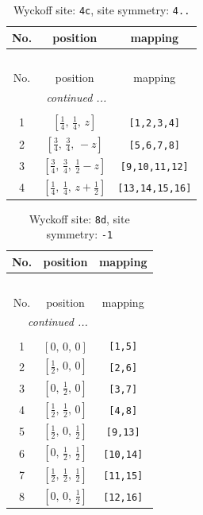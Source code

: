 \documentclass[fleqn,8pt]{jsarticle}
\begin{document}
\renewcommand{\arraystretch}{1.2}
\begin{longtable}{ccc}
\caption{Wyckoff site: {\tt 4c}, site symmetry: {\tt 4..}}
 \\
 \hline \hline
No. & position & mapping \\ \hline \endfirsthead

\multicolumn{2}{l}{\tablename\ \thetable{}} \\
 \hline \hline
No. & position & mapping \\ \hline \endhead

 \hline \hline
\multicolumn{2}{r}{\footnotesize\it continued ...} \\ \endfoot

 \hline \hline
\multicolumn{2}{r}{} \\ \endlastfoot

1 & $\left[ \frac{1}{4},\, \frac{1}{4},\, z \right]$ & {\tt [1,2,3,4]} \\ \hline
2 & $\left[ \frac{3}{4},\, \frac{3}{4},\, - z \right]$ & {\tt [5,6,7,8]} \\ \hline
3 & $\left[ \frac{3}{4},\, \frac{3}{4},\, \frac{1}{2} - z \right]$ & {\tt [9,10,11,12]} \\ \hline
4 & $\left[ \frac{1}{4},\, \frac{1}{4},\, z + \frac{1}{2} \right]$ & {\tt [13,14,15,16]} \\
\end{longtable}
\renewcommand{\arraystretch}{1.2}
\begin{longtable}{ccc}
\caption{Wyckoff site: {\tt 8d}, site symmetry: {\tt -1}}
 \\
 \hline \hline
No. & position & mapping \\ \hline \endfirsthead

\multicolumn{2}{l}{\tablename\ \thetable{}} \\
 \hline \hline
No. & position & mapping \\ \hline \endhead

 \hline \hline
\multicolumn{2}{r}{\footnotesize\it continued ...} \\ \endfoot

 \hline \hline
\multicolumn{2}{r}{} \\ \endlastfoot

1 & $\left[ 0,\, 0,\, 0 \right]$ & {\tt [1,5]} \\ \hline
2 & $\left[ \frac{1}{2},\, 0,\, 0 \right]$ & {\tt [2,6]} \\ \hline
3 & $\left[ 0,\, \frac{1}{2},\, 0 \right]$ & {\tt [3,7]} \\ \hline
4 & $\left[ \frac{1}{2},\, \frac{1}{2},\, 0 \right]$ & {\tt [4,8]} \\ \hline
5 & $\left[ \frac{1}{2},\, 0,\, \frac{1}{2} \right]$ & {\tt [9,13]} \\ \hline
6 & $\left[ 0,\, \frac{1}{2},\, \frac{1}{2} \right]$ & {\tt [10,14]} \\ \hline
7 & $\left[ \frac{1}{2},\, \frac{1}{2},\, \frac{1}{2} \right]$ & {\tt [11,15]} \\ \hline
8 & $\left[ 0,\, 0,\, \frac{1}{2} \right]$ & {\tt [12,16]} \\
\end{longtable}
\end{document}
